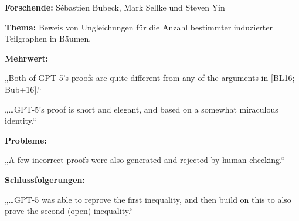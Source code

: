 \documentclass[
  ngerman,
  letterpaper,
  DIV=11]{scrreprt}
\begin{document}
\begin{tcolorbox}[enhanced jigsaw, left=2mm, bottomrule=.15mm, arc=.35mm, rightrule=.15mm, colframe=quarto-callout-note-color-frame, coltitle=black, colback=white, toprule=.15mm, toptitle=1mm, colbacktitle=quarto-callout-note-color!10!white, title=\textcolor{quarto-callout-note-color}{\faInfo}\hspace{0.5em}{Mathematik / Graphentheorie: Teilgraphen-Zählungen}, opacitybacktitle=0.6, leftrule=.75mm, bottomtitle=1mm, titlerule=0mm, opacityback=0, breakable]

\textbf{Forschende:} Sébastien Bubeck, Mark Sellke und Steven Yin

\textbf{Thema:} Beweis von Ungleichungen für die Anzahl bestimmter
induzierter Teilgraphen in Bäumen.

\textbf{Mehrwert:}

„Both of GPT-5's proofs are quite different from any of the arguments in
{[}BL16; Bub+16{]}.``

„\ldots GPT-5's proof is short and elegant, and based on a somewhat
miraculous identity.``

\textbf{Probleme:}

„A few incorrect proofs were also generated and rejected by human
checking.``

\textbf{Schlussfolgerungen:}

„\ldots GPT-5 was able to reprove the first inequality, and then build
on this to also prove the second (open) inequality.``

\end{tcolorbox}
\end{document}

